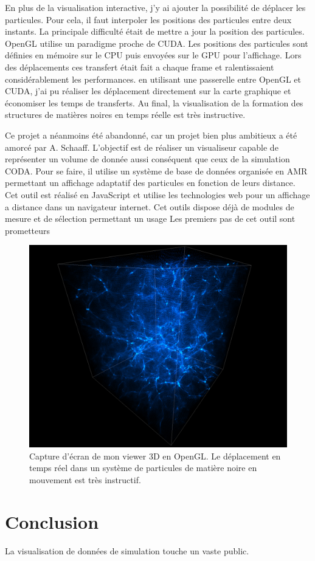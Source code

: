 
En plus de la visualisation interactive, j'y ai ajouter la possibilité de déplacer les particules.
Pour cela, il faut interpoler les positions des particules entre deux instants.
La principale difficulté était de mettre a jour la position des particules.
OpenGL utilise un paradigme proche de CUDA.
Les positions des particules sont définies en mémoire sur le CPU puis envoyées sur le GPU pour l'affichage.
Lors des déplacements ces transfert était fait a chaque frame et ralentissaient considérablement les performances.
en utilisant une passerelle entre OpenGL et CUDA, j'ai pu réaliser les déplacement directement sur la carte graphique et économiser les temps de transferts.
Au final, la visualisation de la formation des structures de matières noires en temps réelle est très instructive.

Ce projet a néanmoins été abandonné, car un projet bien plus ambitieux a été amorcé par A. Schaaff.
L'objectif est de réaliser un visualiseur capable de représenter un volume de donnée aussi conséquent que ceux de la simulation CODA.
Pour se faire, il utilise un système de base de données organisée en AMR permettant un affichage adaptatif des particules en fonction de leurs distance.
Cet outil est réalisé en JavaScript et utilise les technologies web pour un affichage a distance dans un navigateur internet.
Cet outils dispose déjà de modules de mesure et de sélection permettant un usage 
Les premiers pas de cet outil sont prometteurs 





\begin{figure}[bth]
        \includegraphics[width=.95\linewidth]{img/04/part.png} 
        \caption{Capture d’écran de mon viewer 3D en OpenGL.
        Le déplacement en temps réel dans un système de particules de matière noire en mouvement est très instructif.}
 		\label{fig:viewer}
\end{figure}


\section{Conclusion}

La visualisation de données de simulation touche un vaste public.
